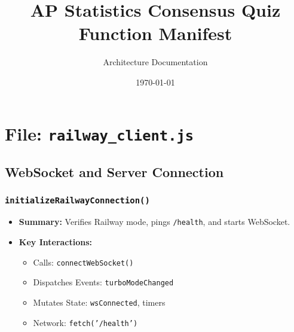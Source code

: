 \documentclass[11pt,letterpaper]{article}
\begin{document}
\title{\textbf{AP Statistics Consensus Quiz\\Function Manifest}}
\author{Architecture Documentation}
\date{\today}
\maketitle

\tableofcontents
\newpage

\section{File: \texttt{railway\_client.js}}

\subsection{WebSocket and Server Connection}

\subsubsection{\texttt{initializeRailwayConnection()}}
\begin{itemize}
    \item \textbf{Summary:} Verifies Railway mode, pings \texttt{/health}, and starts WebSocket.
    \item \textbf{Key Interactions:}
    \begin{itemize}
        \item Calls: \texttt{connectWebSocket()}
        \item Dispatches Events: \texttt{turboModeChanged}
        \item Mutates State: \texttt{wsConnected}, timers
        \item Network: \texttt{fetch('/health')}
    \end{itemize}
\end{itemize}
\end{document}
